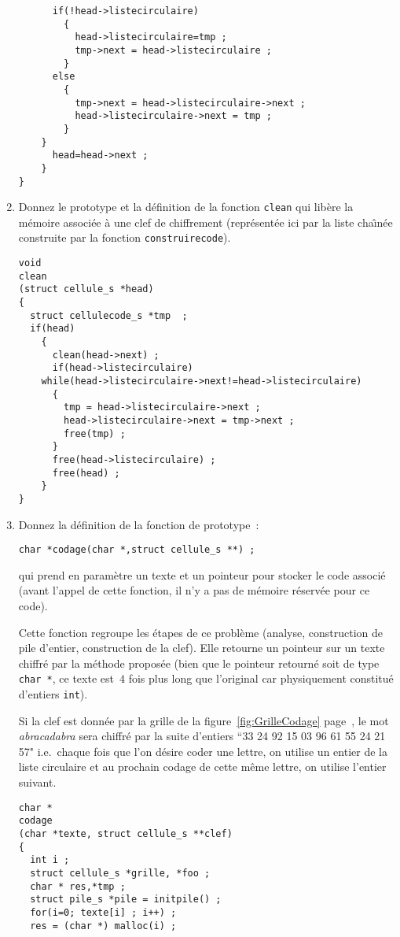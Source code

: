 \begin{enumerate}
\begin{correction}
\begin{verbatim}
	  if(!head->listecirculaire)
	    {
	      head->listecirculaire=tmp ;
	      tmp->next = head->listecirculaire ;
	    }
	  else 
	    {
	      tmp->next = head->listecirculaire->next ;
	      head->listecirculaire->next = tmp ;
	    }
	}
      head=head->next ;
    }
}
\end{verbatim}
  \end{correction}
\fi
\item Donnez le prototype et la d\'efinition de la fonction
  \verb+clean+ qui lib\`ere la m\'emoire associ\'ee \`a une clef de
  chiffrement (repr\'esent\'ee ici par la liste cha\^\i{}n\'ee
  construite par la fonction \verb+construirecode+).
\ifcorrection
  \begin{correction}
\begin{verbatim}
void
clean
(struct cellule_s *head)
{
  struct cellulecode_s *tmp  ;
  if(head)
    {
      clean(head->next) ;
      if(head->listecirculaire)
	while(head->listecirculaire->next!=head->listecirculaire) 
	  {
	    tmp = head->listecirculaire->next ;
	    head->listecirculaire->next = tmp->next ;
	    free(tmp) ;
	  }
      free(head->listecirculaire) ;
      free(head) ;
    }
}
\end{verbatim}
  \end{correction}
\fi
\item Donnez la d\'efinition de la fonction de prototype~:
\begin{verbatim}
char *codage(char *,struct cellule_s **) ; 
\end{verbatim}
  qui prend en param\`etre un texte et un pointeur pour stocker le
  code associ\'e (avant l'appel de cette fonction, il n'y a pas de
  m\'emoire r\'eserv\'ee pour ce code).
  \par
  Cette fonction regroupe les \'etapes de ce probl\`eme (analyse,
  construction de pile d'entier, construction de la clef). Elle
  retourne un pointeur sur un texte chiffr\'e par la m\'ethode
  propos\'ee (bien que le pointeur retourn\'e soit de type %
  \verb+char *+, ce texte est~$4$ fois plus long que l'original car
  physiquement constitu\'e d'entiers \verb+int+).
  \par
  Si la clef est donn\'ee par la grille de la
  figure~\ref{fig:GrilleCodage} page~\pageref{fig:GrilleCodage}, le mot \emph{abracadabra} sera
  chiffr\'e par la suite d'entiers ``33 24 92 15 03 96 61 55 24 21 57"
  i.e.\ chaque fois que l'on d\'esire coder une lettre, on utilise un
  entier de la liste circulaire et au prochain codage de cette m\^eme
  lettre, on utilise l'entier suivant.
\ifcorrection
  \begin{correction}
\begin{verbatim}
char *
codage
(char *texte, struct cellule_s **clef)
{
  int i ;
  struct cellule_s *grille, *foo ;
  char * res,*tmp ;
  struct pile_s *pile = initpile() ;
  for(i=0; texte[i] ; i++) ;
  res = (char *) malloc(i) ;


\end{verbatim}
\end{correction}
\end{enumerate}
